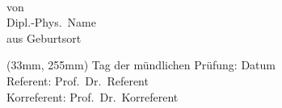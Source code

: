 \begin{titlepage}
\begin{textblock*}{15cm}
\begin{center}
\\[0.6cm]
von\\[0.3cm]
Dipl.-Phys.\ Name\\[0.5ex]
aus Geburtsort
\end{center}
\end{textblock*}

\begin{textblock*}{15cm}(33mm, 255mm) %
\noindent
Tag der mündlichen Prüfung: Datum\\[1.5ex]
Referent: Prof.\ Dr.\ Referent\\[0.5ex]
Korreferent: Prof.\ Dr.\ Korreferent
\end{textblock*}
\rahmen
\end{titlepage}

\cleardoublepage
